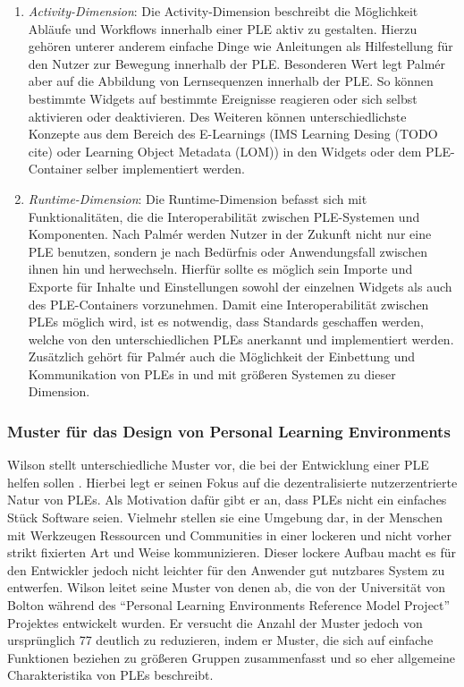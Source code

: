 \begin{enumerate}
 \item \emph{Activity-Dimension}: Die Activity-Dimension beschreibt die Möglichkeit Abläufe und Workflows innerhalb einer PLE aktiv zu gestalten. Hierzu gehören unterer anderem einfache Dinge wie Anleitungen als Hilfestellung für den Nutzer zur Bewegung innerhalb der PLE. Besonderen Wert legt Palmér aber auf die Abbildung von Lernsequenzen innerhalb der PLE. So können bestimmte Widgets auf bestimmte Ereignisse reagieren oder sich selbst aktivieren oder deaktivieren. Des Weiteren können unterschiedlichste Konzepte aus dem Bereich des E-Learnings (IMS Learning Desing (TODO cite) oder Learning Object Metadata (LOM)) in den Widgets oder dem PLE-Container selber implementiert werden.
 \item \emph{Runtime-Dimension}: Die Runtime-Dimension befasst sich mit Funktionalitäten, die die Interoperabilität zwischen PLE-Systemen und Komponenten. Nach Palmér werden Nutzer in der Zukunft nicht nur eine PLE benutzen, sondern je nach Bedürfnis oder Anwendungsfall zwischen ihnen hin und herwechseln. Hierfür sollte es möglich sein Importe und Exporte für Inhalte und Einstellungen sowohl der einzelnen Widgets als auch des PLE-Containers vorzunehmen. Damit eine Interoperabilität
 zwischen PLEs möglich wird, ist es notwendig, dass Standards geschaffen werden, welche von den unterschiedlichen PLEs anerkannt und implementiert werden. Zusätzlich gehört für Palmér auch die Möglichkeit der Einbettung und Kommunikation von PLEs in und mit größeren Systemen zu dieser Dimension.
\end{enumerate}

\subsubsection{Muster für das Design von Personal Learning Environments}\label{section:wilson_patterns}
Wilson stellt unterschiedliche Muster vor, die bei der Entwicklung einer PLE helfen sollen \cite{Wilson2008}. Hierbei legt er seinen Fokus auf die dezentralisierte  nutzerzentrierte Natur von PLEs. Als Motivation dafür gibt er an, dass PLEs nicht ein einfaches Stück Software seien. Vielmehr stellen sie eine Umgebung dar, in der Menschen mit Werkzeugen Ressourcen und Communities in einer lockeren und nicht vorher strikt fixierten Art und Weise kommunizieren. Dieser lockere Aufbau macht es für den Entwickler jedoch nicht leichter für den Anwender gut nutzbares System zu entwerfen. Wilson leitet seine Muster von denen ab, die von der Universität von Bolton während des "`Personal Learning Environments Reference Model Project"' Projektes entwickelt wurden. Er versucht die Anzahl der Muster jedoch von ursprünglich 77 deutlich zu reduzieren, indem er Muster, die sich auf einfache Funktionen beziehen zu größeren Gruppen zusammenfasst und so eher allgemeine Charakteristika von PLEs beschreibt.

